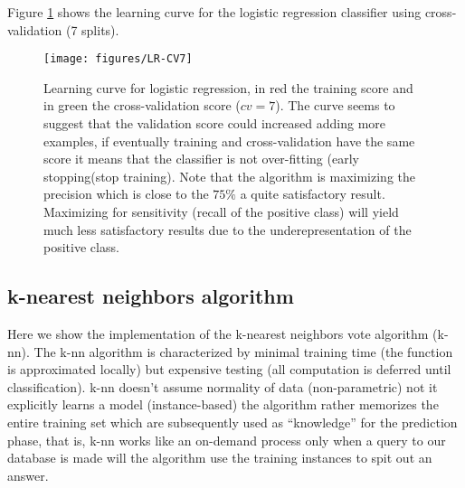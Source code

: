 \documentclass[11pt]{article}
\theoremstyle{definition}
\theoremstyle{remark}
\begin{document}
Figure \ref{fig:lr-cv7} shows the learning curve for the logistic regression classifier using cross-validation (7 splits).
\begin{figure}[H]
        \centering
        \texttt{[image: figures/LR-CV7]}
        \caption{Learning curve for logistic regression, in red the training score and in green the cross-validation score ($cv=7$). The curve seems to suggest that the validation score could increased adding more examples, if eventually training and cross-validation have the same score it means that the classifier is not over-fitting (early stopping(stop training). Note that the algorithm is maximizing the precision which is close to the $75\%$ a quite satisfactory result. Maximizing for sensitivity (recall of the positive class) will yield much less satisfactory results due to the underepresentation of the positive class.   
        } \label{fig:lr-cv7}
\end{figure}



\subsection{k-nearest neighbors algorithm}
\label{se:reskneighbors}
Here we show the implementation of the k-nearest neighbors vote algorithm (k-nn). The k-nn algorithm is characterized by minimal training time (the function is approximated locally) but expensive testing (all computation is deferred until classification).
k-nn doesn't assume normality of data (non-parametric) not it explicitly learns a model (instance-based) the algorithm rather memorizes the entire training set which are subsequently used as “knowledge” for the prediction phase, that is, k-nn works like an on-demand process only when a query to our database is made will the algorithm use the training instances to spit out an answer. 
\end{document}
